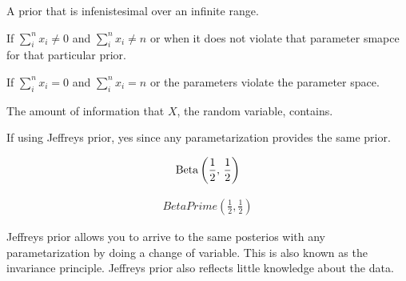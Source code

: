 \documentclass[12pt]{article}
\begin{document}
\begin{enumerate}


A prior that is infenistesimal over an infinite range. 



If $\sum_i^n x_i \neq 0$ and $\sum_i^n x_i \neq n$ or when it does not violate that parameter smapce for that particular prior. 


If $\sum_i^n x_i = 0$ and $\sum_i^n x_i = n$ or the parameters violate the parameter space. 



The amount of information that $X$, the random variable, contains. 


If using Jeffreys prior, yes since any parametarization provides the same prior. 


\begin{align*}
    \mathrm{Beta}\left(\frac{1}{2},\,\frac{1}{2}\right)
\end{align*}


\begin{align*}
    BetaPrime(\frac{1}{2}, \frac{1}{2})
\end{align*}


Jeffreys prior allows you to arrive to the same posterios with any parametarization by doing a change of variable. This is also known as the invariance principle. Jeffreys prior also reflects little knowledge about the data.


\end{enumerate}
\end{document}
